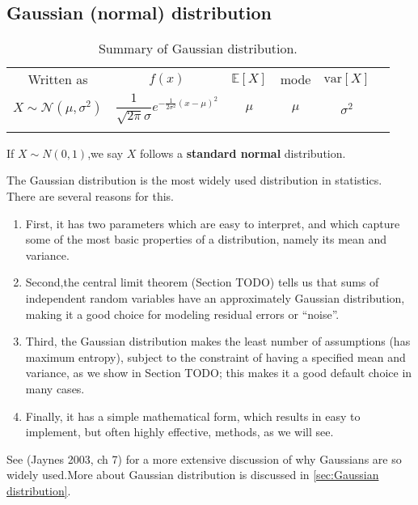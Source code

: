 \subsection{Gaussian (normal) distribution}


\begin{table}
\caption{Summary of Gaussian distribution.}
\centering
\begin{tabular}{cccccc}
\hline\noalign{\smallskip}
Written as & $f(x)$ & $\mathbb{E}[X]$ & mode & $\text{var}[X]$ \\
\noalign{\smallskip}\svhline\noalign{\smallskip}
$X \sim \mathcal{N}(\mu,\sigma^2)$ & $\dfrac{1}{\sqrt{2\pi}\sigma}e^{-\frac{1}{2\sigma^2}\left(x-\mu\right)^2}$ & $\mu$ & $\mu$ & $\sigma^2$ \\
\noalign{\smallskip}\hline
\end{tabular}
\end{table} 

If $X \sim N(0,1)$,we say $X$ follows a \textbf{standard normal} distribution.

The Gaussian distribution is the most widely used distribution in statistics. There are several reasons for this. 
\begin{enumerate}
\item First, it has two parameters which are easy to interpret, and which capture some of the most basic properties of a distribution, namely its mean and variance. 
\item Second,the central limit theorem (Section TODO) tells us that sums of independent random variables have an approximately Gaussian distribution, making it a good choice for modeling residual errors or “noise”. 
\item Third, the Gaussian distribution makes the least number of assumptions (has maximum entropy), subject to the constraint of having a specified mean and variance, as we show in Section TODO; this makes it a good default choice in many cases. 
\item Finally, it has a simple mathematical form, which results in easy to implement, but often highly effective, methods, as we will see. 
\end{enumerate}
See (Jaynes 2003, ch 7) for a more extensive discussion of why Gaussians are so widely used.More about Gaussian distribution is discussed in \ref{sec:Gaussian distribution}. 

